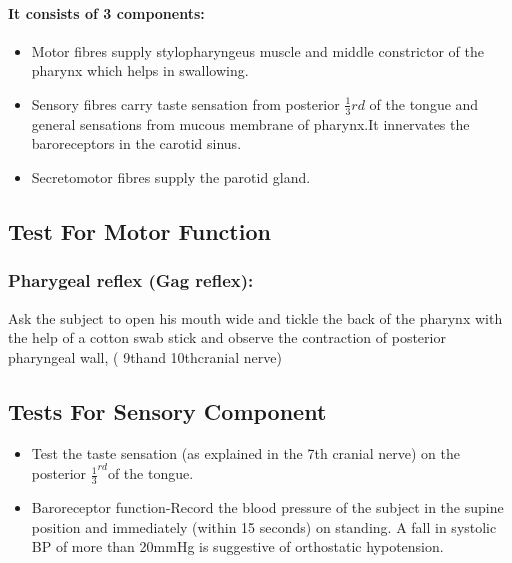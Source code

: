 \documentclass[a4paper,12pt,openany,twoside]{book}
\begin{document}
\paragraph{It consists of 3 components:}
\begin{itemize}
\item[]Motor fibres supply stylopharyngeus muscle and middle constrictor of the pharynx which helps in swallowing.
\item[]Sensory fibres carry taste sensation from posterior $\frac{1}{3}$${rd}$ of the tongue and general sensations from mucous membrane of pharynx.It innervates the baroreceptors in the carotid sinus.
\item[]Secretomotor fibres supply the parotid gland.
\end{itemize}

\subsection*{Test For Motor Function}
\subsubsection*{Pharygeal reflex (Gag reflex):}
Ask the subject to open his mouth wide and tickle the back of the pharynx with the help of a cotton swab stick and observe the contraction of posterior pharyngeal wall, ( 9thand 10thcranial nerve)

\subsection*{Tests For Sensory Component}
\begin{itemize}
\item{Test the taste sensation (as explained in the 7th cranial nerve) on the posterior $\frac{1}{3}^{rd}$of the tongue.}
\item{Baroreceptor function-Record the blood pressure of the subject in the supine position and immediately (within 15 seconds) on standing. A fall in systolic BP of more than 20mmHg is suggestive of orthostatic hypotension.}
\end{itemize}
\end{document}
